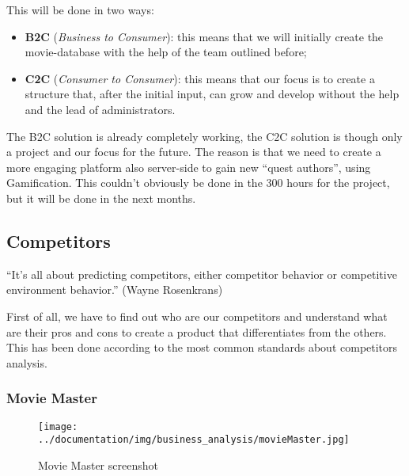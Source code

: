 This will be done in two ways:
\begin{itemize}
\item \textbf{B2C} (\textit{Business to Consumer}): this means that we will initially create the movie-database with the help of the team outlined before;
\item \textbf{C2C} (\textit{Consumer to Consumer}): this means that our focus is to create a structure that, after the initial input, can grow and develop without the help and the lead of administrators.
\end{itemize}

The B2C solution is already completely working, the C2C solution is though only a project and our focus for the future. The reason is that we need to create a more engaging platform also server-side to gain new ``quest authors'', using Gamification. This couldn't obviously be done in the 300 hours for the project, but it will be done in the next months. 

\subsection{Competitors}

\begin{center}
``It's all about predicting competitors, either competitor behavior or competitive environment behavior.'' (Wayne
Rosenkrans)
\end{center}

First of all, we have to find out who are our competitors and understand what are their pros and cons to create a product that differentiates from the others. This has been done according to the most common standards about competitors analysis. \cite{market-driven-management}

\subsubsection{Movie Master}

\begin{figure}[H]
\centering %
\texttt{[image: ../documentation/img/business\_analysis/movieMaster.jpg]}
\caption{Movie Master screenshot}
\label{fig:movieMaster}
\end{figure}

